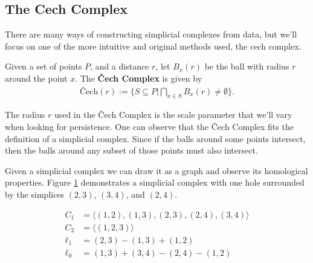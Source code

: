 \subsection{The Cech Complex}\label{sec:cech-complex}

There are many ways of constructing simplicial complexes from data, but we'll focus on one of the more intuitive and original methods used, the cech complex.

\begin{definition}\label{def:cech-complex}
    Given a set of points \(P\), and a distance \(r\), let \(B_x(r)\) be the ball with radius \(r\) around the point \(x\). The \textbf{\v{C}ech Complex} is given by
		\begin{align*}
            \textrm{\v{C}ech}(r) := \{ S \subseteq P | \bigcap_{x\in S} B_x(r) \neq \emptyset \}
            .
		\end{align*}
		\cite{wagner}
\end{definition}


The radius \(r\) used in the \v{C}ech Complex is the scale parameter that we'll vary when looking for persistence. One can observe that the \v{C}ech Complex fits the definition of a simplicial complex.
Since if the balls around some points intersect, then the balls around any subset of those points must also intersect.

Given a simplicial complex we can draw it as a graph and observe its homological properties.
Figure \ref{fig:example-cech} demonstrates a simplicial complex with one hole surrounded by the simplices \((2,3)\), \((3,4)\), and \((2,4)\).

\begin{figure}
    \centering
    \begin{minipage}{.5\textwidth}
        \centering
        
    \end{minipage}%
    \begin{minipage}{.5\textwidth}
        \begin{align*}
            C_1 &= \langle (1,2),(1,3),(2,3),(2,4),(3,4) \rangle \\
            C_2 &= \langle (1,2,3) \rangle \\
            \ell_1 &= (2,3) - (1,3) + (1,2) \\
            \ell_0 &= (1,3) + (3,4) - (2,4) - (1,2)
        \end{align*}
    \end{minipage}
    \caption{}
    \label{fig:example-cech}
\end{figure}

